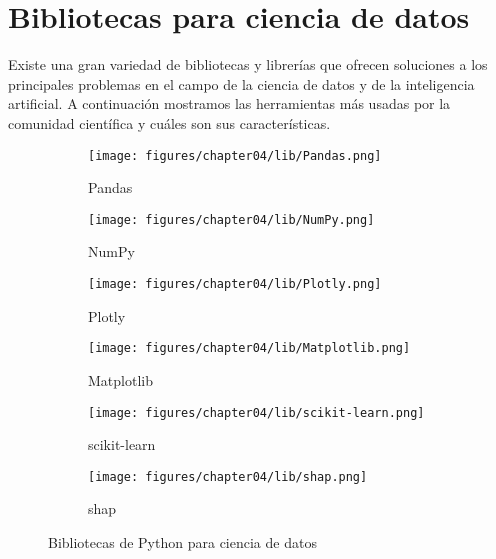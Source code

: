 \clearpage
\section{Bibliotecas para ciencia de datos}

Existe una gran variedad de bibliotecas y librerías que ofrecen soluciones a los principales problemas en el campo de la ciencia de datos y de la inteligencia artificial. A continuación mostramos las herramientas más usadas por la comunidad científica y cuáles son sus características.

\begin{figure}[H]
    \centering
    \captionsetup{justification=centering}

    \begin{subfigure}{0.15\textwidth}
        \centering
        \texttt{[image: figures/chapter04/lib/Pandas.png]}
        \caption{Pandas}
        \label{fig:imagen1}
    \end{subfigure}
    \hfill
    \begin{subfigure}{0.15\textwidth}
        \centering
        \texttt{[image: figures/chapter04/lib/NumPy.png]}
        \caption{NumPy}
        \label{fig:imagen2}
    \end{subfigure}
    \hfill
    \begin{subfigure}{0.15\textwidth}
        \centering
        \texttt{[image: figures/chapter04/lib/Plotly.png]}
        \caption{Plotly}
        \label{fig:imagen3}
    \end{subfigure}
    
    \bigskip 
    
    \begin{subfigure}{0.15\textwidth}
        \centering
        \texttt{[image: figures/chapter04/lib/Matplotlib.png]}
        \caption{Matplotlib}
        \label{fig:imagen4}
    \end{subfigure}
    \hfill
    \begin{subfigure}{0.15\textwidth}
        \centering
        \texttt{[image: figures/chapter04/lib/scikit-learn.png]}
        \caption{scikit-learn}
        \label{fig:imagen5}
    \end{subfigure}
    \hfill
    \begin{subfigure}{0.15\textwidth}
        \centering
        \texttt{[image: figures/chapter04/lib/shap.png]}
        \caption{shap}
        \label{fig:imagen6}
    \end{subfigure}
    
    \caption{Bibliotecas de Python para ciencia de datos}
    \label{fig:cuadricula}
\end{figure}

